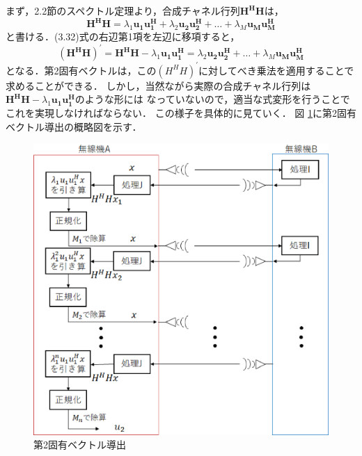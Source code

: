 まず，2.2節のスペクトル定理より，合成チャネル行列$\bm{H^HH}$は，
\begin{equation}
    \bm{H^HH} = \lambda_1\bm{u_1u_1^H}+\lambda_2\bm{u_2u_2^H}+\ldots+\lambda_M\bm{u_Mu_M^H}
\end{equation}
と書ける．(3.32)式の右辺第1項を左辺に移項すると，
\begin{equation}
    (\bm{H^HH})^{\prime}=\bm{H^HH}-\lambda_1\bm{u_1u_1^H}=\lambda_2\bm{u_2u_2^H}+\ldots+\lambda_M\bm{u_Mu_M^H}
\end{equation}
となる．第2固有ベクトルは，この$(H^HH)^{\prime}$に対してべき乗法を適用することで求めることができる．
しかし，当然ながら実際の合成チャネル行列は$\bm{H^HH}-\lambda_1\bm{u_1u_1^H}$のような形には
なっていないので，適当な式変形を行うことでこれを実現しなければならない．
この様子を具体的に見ていく．
図 \ref{figProcIJ2}に第2固有ベクトル導出の概略図を示す．
\begin{figure}[t]
    \centering
    \includegraphics[width=0.7\linewidth]{chapter3/figure/ProcIJ2.eps}
    \caption{第2固有ベクトル導出}
    \label{figProcIJ2}
\end{figure}

